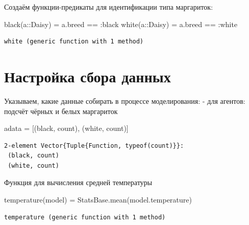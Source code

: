 \documentclass[
  12pt,
  a4paper,
  DIV=11,
  numbers=noendperiod]{scrreprt}
\newenvironment{Shaded}{\begin{snugshade}}{\end{snugshade}}
\newcommand{\DataTypeTok}[1]{\textcolor[rgb]{0.68,0.00,0.00}{#1}}
\newcommand{\FunctionTok}[1]{\textcolor[rgb]{0.28,0.35,0.67}{#1}}
\newcommand{\NormalTok}[1]{\textcolor[rgb]{0.00,0.23,0.31}{#1}}
\newcommand{\OperatorTok}[1]{\textcolor[rgb]{0.37,0.37,0.37}{#1}}
\begin{document}
Создаём функции-предикаты для идентификации типа маргариток:

\begin{Shaded}
\begin{Highlighting}[]
\FunctionTok{black}\NormalTok{(a}\OperatorTok{::}\DataTypeTok{Daisy}\NormalTok{) }\OperatorTok{=}\NormalTok{ a.breed }\OperatorTok{==} \OperatorTok{:}\NormalTok{black}
\FunctionTok{white}\NormalTok{(a}\OperatorTok{::}\DataTypeTok{Daisy}\NormalTok{) }\OperatorTok{=}\NormalTok{ a.breed }\OperatorTok{==} \OperatorTok{:}\NormalTok{white}
\end{Highlighting}
\end{Shaded}

\begin{verbatim}
white (generic function with 1 method)
\end{verbatim}

\section{Настройка сбора
данных}\label{ux43dux430ux441ux442ux440ux43eux439ux43aux430-ux441ux431ux43eux440ux430-ux434ux430ux43dux43dux44bux445-3}

Указываем, какие данные собирать в процессе моделирования: - для
агентов: подсчёт чёрных и белых маргариток

\begin{Shaded}
\begin{Highlighting}[]
\NormalTok{adata }\OperatorTok{=}\NormalTok{ [(black, count), (white, count)]}
\end{Highlighting}
\end{Shaded}

\begin{verbatim}
2-element Vector{Tuple{Function, typeof(count)}}:
 (black, count)
 (white, count)
\end{verbatim}

Функция для вычисления средней температуры

\begin{Shaded}
\begin{Highlighting}[]
\FunctionTok{temperature}\NormalTok{(model) }\OperatorTok{=}\NormalTok{ StatsBase.}\FunctionTok{mean}\NormalTok{(model.temperature)}
\end{Highlighting}
\end{Shaded}

\begin{verbatim}
temperature (generic function with 1 method)
\end{verbatim}
\end{document}
